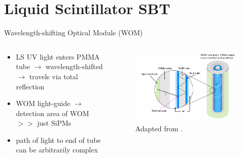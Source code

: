 \documentclass[aspectratio=169]{beamer}
\begin{document}
	
	
	\section{Liquid Scintillator SBT}
	
	
	
	
	
	\begin{frame}{Wavelength-shifting Optical Module (WOM)}
		\vspace{-1cm}
		
		\begin{columns}
			
			\begin{column}{0.4\textwidth}
				\begin{itemize}
					\item LS UV light enters PMMA tube $\rightarrow$ wavelength-shifted $\rightarrow$ travels via total reflection
					\item WOM light-guide $\rightarrow$ detection area of WOM $>>$ just SiPMs
					\item path of light to end of tube can be arbitrarily complex
				\end{itemize}
				
			\end{column}
			
			
			\begin{column}{0.7\textwidth}
				\begin{figure}
					\centering
					\includegraphics[width=.9\textwidth]{pictures/wom-principle.pdf}
					\caption{Adapted from \cite{ZIMMERMANN}.}
				\end{figure}
				
			\end{column}
			
		\end{columns}
		
		
	\end{frame}
	
\end{document}
